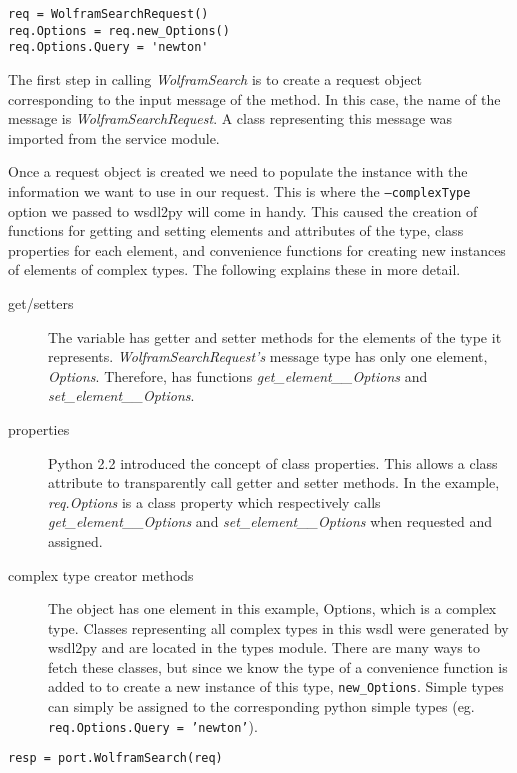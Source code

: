 \begin{verbatim}
req = WolframSearchRequest()
req.Options = req.new_Options()
req.Options.Query = 'newton'
\end{verbatim}

The first step in calling {\it WolframSearch} is to create a request object
corresponding to the input message of the method.  In this case, the name of
the message is {\it WolframSearchRequest}.  A class representing this message
was imported from the service module.

Once a request object is created we need to populate the instance with the
information we want to use in our request.  This is where the {\tt --complexType}
option we passed to wsdl2py will come in handy.  This caused the creation of 
functions for getting and setting elements and attributes of the type, class 
properties for each element, and convenience functions for creating new instances
of elements of complex types.  The following explains these in more detail.

\begin{description}
\item[get/setters] The  variable has getter and setter methods for the
elements of the type it represents.  {\it WolframSearchRequest's} message type
has only one element, {\it Options}.  Therefore,  has functions
{\it get_element__Options} and {\it set_element__Options}.

\item[properties] Python 2.2 introduced the concept of class properties.  This
allows a class attribute to transparently call getter and setter methods.  In the
example, {\it req.Options} is a class property which respectively calls 
{\it get_element__Options} and {\it set_element__Options} when requested 
and assigned.

\item[complex type creator methods] The  object has one element in this
example, Options, which is a complex type.  Classes representing all complex types
in this wsdl were generated by wsdl2py and are located in the types module.  There
are many ways to fetch these classes, but since we know the type of 
a convenience function is added to  to create a new instance of this type,
{\tt new_Options}.  Simple types can simply be assigned to the corresponding python
simple types (eg. {\tt req.Options.Query = 'newton'}).
\end{description}

\begin{verbatim}
resp = port.WolframSearch(req)
\end{verbatim}


